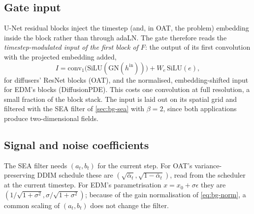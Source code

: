\subsection{Gate input}
U-Net residual blocks inject the timestep (and, in OAT, the problem) embedding inside the block rather than through adaLN. The gate therefore reads the \emph{timestep-modulated input of the first block of $F$}: the output of its first convolution with the projected embedding added,
\begin{equation}
  I = \mathrm{conv}_1\big(\mathrm{SiLU}(\mathrm{GN}(h^{\mathrm{in}}))\big) + W_{e}\,\mathrm{SiLU}(e),
\end{equation}
for diffusers' ResNet blocks (OAT), and the normalised, embedding-shifted input for EDM's blocks (DiffusionPDE). This costs one convolution at full resolution, a small fraction of the block stack. The input is laid out on its spatial grid and filtered with the SEA filter of \cref{sec:bg-sea} with $\beta=2$, since both applications produce two-dimensional fields.

\subsection{Signal and noise coefficients}
The SEA filter needs $(a_t,b_t)$ for the current step. For OAT's variance-preserving DDIM schedule these are $(\sqrt{\bar\alpha_t},\sqrt{1-\bar\alpha_t})$, read from the scheduler at the current timestep. For EDM's parametrisation $x = x_0+\sigma\epsilon$ they are $(1/\sqrt{1+\sigma^2},\sigma/\sqrt{1+\sigma^2})$; because of the gain normalisation of \cref{eq:bg-norm}, a common scaling of $(a_t,b_t)$ does not change the filter.


